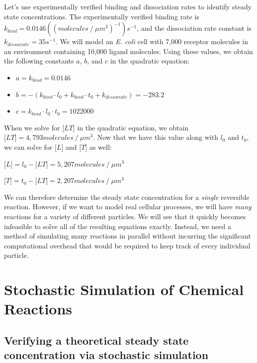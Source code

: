 Let's use experimentally verified binding and dissociation rates to identify steady state concentrations. The experimentally verified binding rate is $k_{bind} = 0.0146 ((molecules\mathbin{/}\mu m^3)^{-1})s^{-1}$, and the dissociation rate constant is $k_{dissociate} = 35s^{-1}$. We will model an \textit{E. coli} cell with 7,000 receptor molecules in an environment containing 10,000 ligand molecules. Using these values, we obtain the following constants $a$, $b$, and $c$ in the quadratic equation:

\begin{itemize}
 \item $a = k_{bind} = 0.0146$
 \item $b = - (k_{bind} \cdot l_0 + k_{bind} \cdot t_0 + k_{dissociate}) = -283.2$
 \item $c = k_{bind} \cdot l_0 \cdot t_0 = 1022000$
\end{itemize}

When we solve for $\text{[}LT\text{]}$ in the quadratic equation, we obtain $\text{[}LT\text{]} = 4,793 molecules\mathbin{/}\mu m^3$. Now that we have this value along with $l_0$ and $t_0$, we can solve for $\text{[}L\text{]}$ and $\text{[}T\text{]}$ as well:

$\text{[}L\text{]} = l_0 - \text{[}LT\text{]} = 5,207 molecules\mathbin{/}\mu m^3$

$\text{[}T\text{]} = t_0 - \text{[}LT\text{]} = 2,207 molecules\mathbin{/}\mu m^3$

We can therefore determine the steady state concentration for a \textit{single} reversible reaction. However, if we want to model real cellular processes, we will have \textit{many} reactions for a variety of different particles. We will see that it quickly becomes infeasible to solve all of the resulting equations exactly. Instead, we need a method of simulating many reactions in parallel without incurring the significant computational overhead that would be required to keep track of every individual particle.

\FloatBarrier
{}

\section{Stochastic Simulation of Chemical Reactions}
\label{sec:stochastic_simulation_of_chemical_reactions}
\subsection{Verifying a theoretical steady state concentration via stochastic simulation}

